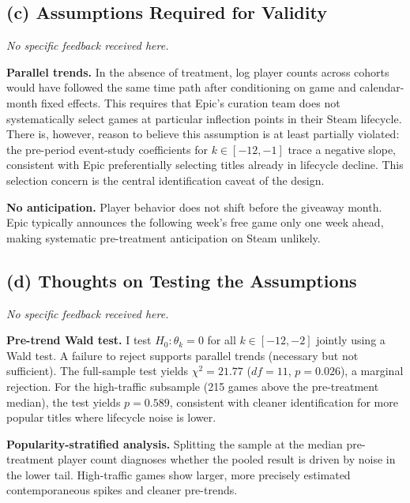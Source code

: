 \documentclass[11pt]{article}
\begin{document}
\subsection{(c) Assumptions Required for Validity}

\textit{No specific feedback received here.}

\textbf{Parallel trends.} In the absence of treatment, log player counts
across cohorts would have followed the same time path after conditioning on
game and calendar-month fixed effects. This requires that Epic's curation
team does not systematically select games at particular inflection points in
their Steam lifecycle. There is, however, reason to believe this assumption
is at least partially violated: the pre-period event-study coefficients for
$k \in [-12, -1]$ trace a negative slope, consistent with Epic preferentially
selecting titles already in lifecycle decline. This selection concern is the
central identification caveat of the design.

\textbf{No anticipation.} Player behavior does not shift before the giveaway
month. Epic typically announces the following week's free game only one week
ahead, making systematic pre-treatment anticipation on Steam unlikely.

\subsection{(d) Thoughts on Testing the Assumptions}

\textit{No specific feedback received here.}

\textbf{Pre-trend Wald test.} I test $H_0: \theta_k = 0$ for all
$k \in [-12, -2]$ jointly using a Wald test. A failure to reject supports
parallel trends (necessary but not sufficient). The full-sample test yields
$\chi^2 = 21.77$ ($df = 11$, $p = 0.026$), a marginal rejection. For the
high-traffic subsample (215 games above the pre-treatment median), the test
yields $p = 0.589$, consistent with cleaner identification for more popular
titles where lifecycle noise is lower.

\textbf{Popularity-stratified analysis.} Splitting the sample at the median
pre-treatment player count diagnoses whether the pooled result is driven by
noise in the lower tail. High-traffic games show larger, more precisely
estimated contemporaneous spikes and cleaner pre-trends.
\end{document}
